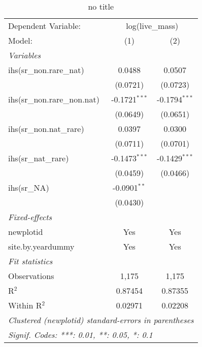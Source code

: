 
\begin{table}[htbp]
   \caption{no title}
   \centering
   \begin{tabular}{lcc}
      \tabularnewline \midrule \midrule
      Dependent Variable: & \multicolumn{2}{c}{log(live\_mass)}\\
      Model:                       & (1)             & (2)\\  
      \midrule
      \emph{Variables}\\
      ihs(sr\_non.rare\_nat)       & 0.0488          & 0.0507\\   
                                   & (0.0721)        & (0.0723)\\   
      ihs(sr\_non.rare\_non.nat)   & -0.1721$^{***}$ & -0.1794$^{***}$\\   
                                   & (0.0649)        & (0.0651)\\   
      ihs(sr\_non.nat\_rare)       & 0.0397          & 0.0300\\   
                                   & (0.0711)        & (0.0701)\\   
      ihs(sr\_nat\_rare)           & -0.1473$^{***}$ & -0.1429$^{***}$\\   
                                   & (0.0459)        & (0.0466)\\   
      ihs(sr\_NA)                  & -0.0901$^{**}$  &   \\   
                                   & (0.0430)        &   \\   
      \midrule
      \emph{Fixed-effects}\\
      newplotid                    & Yes             & Yes\\  
      site.by.yeardummy            & Yes             & Yes\\  
      \midrule
      \emph{Fit statistics}\\
      Observations                 & 1,175           & 1,175\\  
      R$^2$                        & 0.87454         & 0.87355\\  
      Within R$^2$                 & 0.02971         & 0.02208\\  
      \midrule \midrule
      \multicolumn{3}{l}{\emph{Clustered (newplotid) standard-errors in parentheses}}\\
      \multicolumn{3}{l}{\emph{Signif. Codes: ***: 0.01, **: 0.05, *: 0.1}}\\
   \end{tabular}
\end{table}


